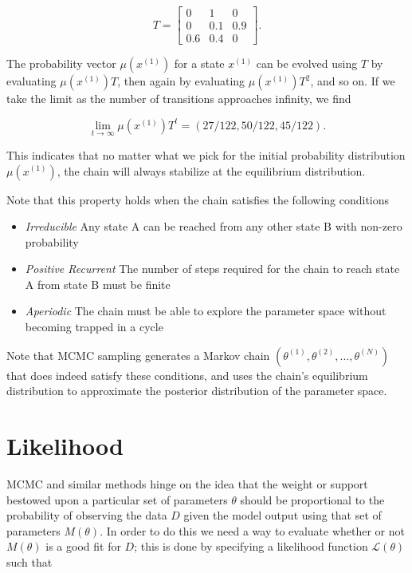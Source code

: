     \begin{equation}
    	T = 
	    \begin{bmatrix}
	        0 & 1 & 0 \\
	        0 & 0.1 & 0.9 \\
	        0.6 & 0.4 & 0
	    \end{bmatrix}.
    \end{equation}

    The probability vector $\mu(x^{(1)})$ for a state $x^{(1)}$ can be evolved using $T$ by evaluating $\mu(x^{(1)})T$, then again by evaluating $\mu(x^{(1)})T^2$, and so on. If we take the limit as the number of transitions approaches infinity, we find

    \begin{equation}
    	\lim_{t \to \infty} \mu(x^{(1)})T^t = (27/122, 50/122, 45/122).
    \end{equation}

    This indicates that no matter what we pick for the initial probability distribution $\mu(x^{(1)})$, the chain will always stabilize at the equilibrium distribution.

    Note that this property holds when the chain satisfies the following conditions

    \begin{itemize}
        \item \textit{Irreducible} Any state A can be reached from any other state B with non-zero probability
        \item \textit{Positive Recurrent} The number of steps required for the chain to reach state A from state B must be finite
        \item \textit{Aperiodic} The chain must be able to explore the parameter space without becoming trapped in a cycle
    \end{itemize}

    Note that MCMC sampling generates a Markov chain $(\theta^{(1)}, \theta^{(2)},..., \theta^{(N)})$ that does indeed satisfy these conditions, and uses the chain's equilibrium distribution to approximate the posterior distribution of the parameter space.    


\section{Likelihood}

    MCMC and similar methods hinge on the idea that the weight or support bestowed upon a particular set of parameters $\theta$ should be proportional to the probability of observing the data $D$ given the model output using that set of parameters $M(\theta)$. In order to do this we need a way to evaluate whether or not $M(\theta)$ is a good fit for $D$; this is done by specifying a likelihood function $\mathcal{L}(\theta)$ such that

